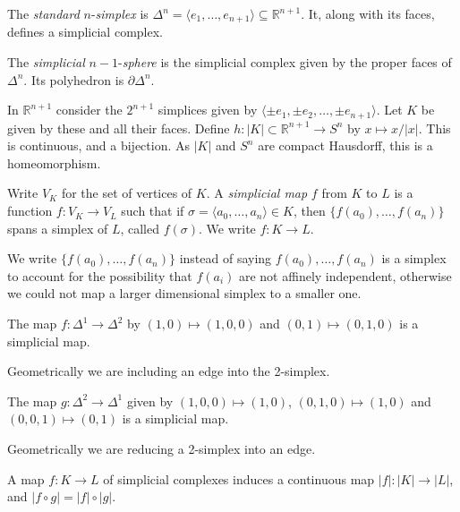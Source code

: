 \documentclass[12pt]{article}
\begin{document}
\begin{exbox}
	The \emph{standard} $n$-\emph{simplex} is $\Delta^n = \langle e_1, \ldots, e_{n+1}\rangle \subseteq \mathbb{R}^{n+1}$. It, along with its faces, defines a simplicial complex.

	The \emph{simplicial} $n-1$-\emph{sphere} is the simplicial complex given by the proper faces of $\Delta^n$. Its polyhedron is $\partial \Delta^n$.

In $\mathbb{R}^{n+1}$ consider the $2^{n+1}$ simplices given by $\langle \pm e_1, \pm e_2, \ldots, \pm e_{n+1} \rangle$. Let $K$ be given by these and all their faces. Define $h : |K| \subset \mathbb{R}^{n+1} \to S^n$ by $x \mapsto x/|x|$. This is continuous, and a bijection. As $|K|$ and $S^n$ are compact Hausdorff, this is a homeomorphism.
\end{exbox}

\begin{definition}
	Write $V_K$ for the set of vertices of $K$. A \emph{simplicial map} $f$ from $K$ to $L$ is a function $f : V_K \to V_L$ such that if $\sigma = \langle a_0, \ldots, a_n \rangle \in K$, then $\{f(a_0), \ldots, f(a_n)\}$ spans a simplex of $L$, called $f(\sigma)$. We write $f : K \to L$.
\end{definition}

We write $\{f(a_0), \ldots, f(a_n)\}$ instead of saying $f(a_0), \ldots, f(a_n)$ is a simplex to account for the possibility that $f(a_i)$ are not affinely independent, otherwise we could not map a larger dimensional simplex to a smaller one.

\begin{exbox}
	The map $f : \Delta^1 \to \Delta^2$ by $(1, 0) \mapsto (1, 0, 0)$ and $(0, 1) \mapsto (0, 1, 0)$ is a simplicial map.

	Geometrically we are including an edge into the 2-simplex.

	The map $g : \Delta^2 \to \Delta^1$ given by $(1, 0, 0) \mapsto (1, 0)$, $(0, 1, 0) \mapsto (1, 0)$ and $(0, 0, 1) \mapsto (0, 1)$ is a simplicial map.

	Geometrically we are reducing a 2-simplex into an edge.
\end{exbox}

\begin{lemma}
	A map $f : K \to L$ of simplicial complexes induces a continuous map $|f| : |K| \to |L|$, and $|f \circ g| = |f| \circ |g|$.
\end{lemma}

\end{document}
